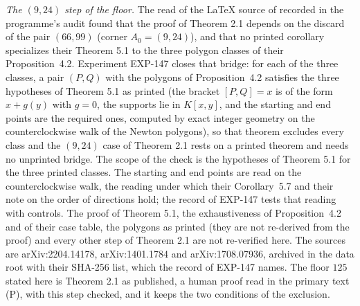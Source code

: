 \documentclass[11pt]{article}
\theoremstyle{remark}
\begin{document}
\emph{The $(9,24)$ step of the floor.} The read of the LaTeX source of \cite{GGHV2022} recorded in the programme's audit found that the proof of Theorem 2.1 depends on the discard of the pair $(66,99)$ (corner $A_0=(9,24)$), and that no printed corollary specializes
their Theorem 5.1 to the three polygon classes of their Proposition~4.2. Experiment EXP-147 closes that bridge: for each of the three classes, a pair $(P,Q)$ with the polygons of Proposition~4.2 satisfies the three hypotheses of Theorem 5.1 as printed (the bracket $[P,Q]=x$ is of the form $x+g(y)$ with $g=0$, the supports lie in $K[x,y]$, and the starting and end points are the required ones, computed by exact integer geometry on the counterclockwise walk of the Newton polygons),
so that theorem excludes every class and the $(9,24)$ case of Theorem 2.1 rests on a printed theorem and needs no unprinted bridge. The scope of the check is the hypotheses of Theorem 5.1 for the three printed classes. The starting and end points are read on the counterclockwise walk, the reading under which their Corollary~5.7 and their note on the order of directions hold; the record of EXP-147 tests that reading with controls. The proof of Theorem 5.1, the exhaustiveness of Proposition~4.2 and of their case table, the polygons as printed (they are not re-derived from the proof) and every other step of Theorem 2.1 are not re-verified here.
The sources are arXiv:2204.14178, arXiv:1401.1784 and arXiv:1708.07936, archived in the data root with their SHA-256 list, which the record of EXP-147 names. The floor $125$ stated here is Theorem 2.1 as published, a human proof read in the primary text (P), with this step checked, and it keeps the two conditions of the exclusion.
\end{document}
